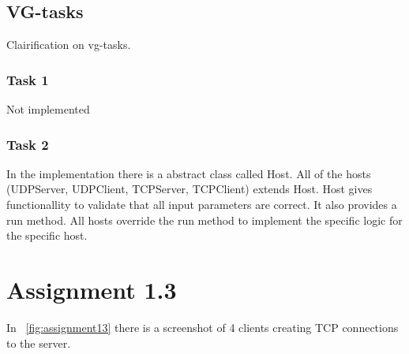 \documentclass[a4paper,12pt]{article} %
\begin{document}
{\subsection{VG-tasks}

Clairification on vg-tasks.

\subsubsection{Task 1}

Not implemented

\subsubsection{Task 2}
\label{sec:task2}
In the implementation there is a abstract class called Host.
All of the hosts (UDPServer, UDPClient, TCPServer, TCPClient) extends Host.
Host gives functionallity to validate that all input parameters are correct.
It also provides a run method. All hosts override the run method to implement 
the specific logic for the specific host.

\clearpage

\section{Assignment 1.3}
\label{sec:assignment13}
In ~\ref{fig:assignment13} there is a screenshot of 4 clients creating TCP connections to 
the server.

}
\end{document}
